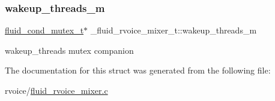 \subsubsection{\texorpdfstring{wakeup\+\_\+threads\+\_\+m}{wakeup\_threads\_m}}
{\footnotesize\ttfamily \hyperlink{fluid__sys_8h_a979272b5d11e0e22a1e7a9d6529233bb}{fluid\+\_\+cond\+\_\+mutex\+\_\+t}$\ast$ \+\_\+fluid\+\_\+rvoice\+\_\+mixer\+\_\+t\+::wakeup\+\_\+threads\+\_\+m}

wakeup\+\_\+threads mutex companion 

The documentation for this struct was generated from the following file\+:\begin{DoxyCompactItemize}
\item 
rvoice/\hyperlink{fluid__rvoice__mixer_8c}{fluid\+\_\+rvoice\+\_\+mixer.\+c}\end{DoxyCompactItemize}
